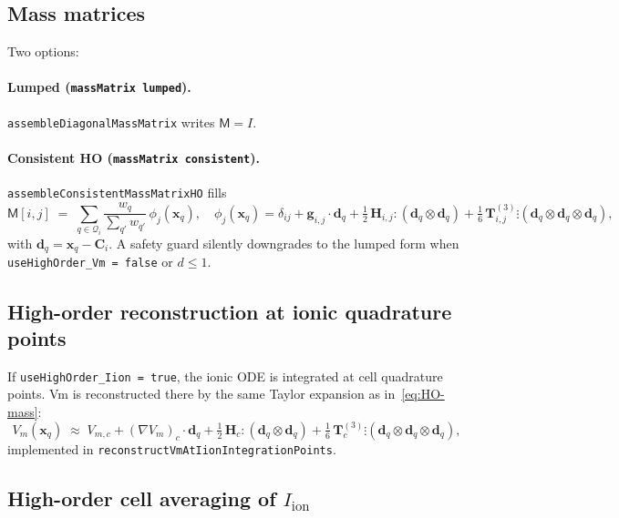 \documentclass[11pt,a4paper]{article}
\newcommand{\Vm}{V_{m}}
\newcommand{\Vmsub}[1]{V_{m,#1}}
\newcommand{\Iion}{I_{\text{ion}}}
\newcommand{\grad}{\nabla}
\newcommand{\Mmass}{\mathsf{M}}
\newcommand{\code}[1]{\texttt{\small #1}}
\begin{document}
\subsection{Mass matrices}

Two options:
\paragraph{Lumped (\code{massMatrix lumped}).}
\code{assembleDiagonalMassMatrix} writes $\Mmass = I$.

\paragraph{Consistent HO (\code{massMatrix consistent}).}
\code{assembleConsistentMassMatrixHO} fills
\begin{equation}
  \Mmass[i, j] \;=\;
   \sum_{q \in \mathcal{Q}_{i}}
       \frac{w_{q}}{\sum_{q'} w_{q'}}\,
       \phi_{j}(\mathbf{x}_{q}),
   \quad
   \phi_{j}(\mathbf{x}_{q})
    = \delta_{ij}
    + \mathbf{g}_{i,j} \cdot \mathbf{d}_{q}
    + \tfrac{1}{2}\, \mathbf{H}_{i,j} \!:\! (\mathbf{d}_{q} \otimes \mathbf{d}_{q})
    + \tfrac{1}{6}\, \mathbf{T}^{(3)}_{i,j} \!\vdots\!
        (\mathbf{d}_{q} \otimes \mathbf{d}_{q} \otimes \mathbf{d}_{q}),
   \label{eq:HO-mass}
\end{equation}
with $\mathbf{d}_{q} = \mathbf{x}_{q} - \mathbf{C}_{i}$. A safety guard
silently downgrades to the lumped form when
\code{useHighOrder\_Vm = false} or $d \le 1$.

\subsection{High-order reconstruction at ionic quadrature points}

If \code{useHighOrder\_Iion = true}, the ionic ODE is integrated at
cell quadrature points. Vm is reconstructed there by the same Taylor
expansion as in~\eqref{eq:HO-mass}:
\begin{equation}
  \Vm(\mathbf{x}_{q})
   \;\approx\;
   \Vmsub{c} + (\grad \Vm)_{c} \cdot \mathbf{d}_{q}
   + \tfrac{1}{2}\, \mathbf{H}_{c} \!:\! (\mathbf{d}_{q} \otimes \mathbf{d}_{q})
   + \tfrac{1}{6}\, \mathbf{T}^{(3)}_{c} \!\vdots\!
       (\mathbf{d}_{q} \otimes \mathbf{d}_{q} \otimes \mathbf{d}_{q}),
   \label{eq:HO-vm}
\end{equation}
implemented in \code{reconstructVmAtIionIntegrationPoints}.

\subsection{High-order cell averaging of $\Iion$}
\end{document}
